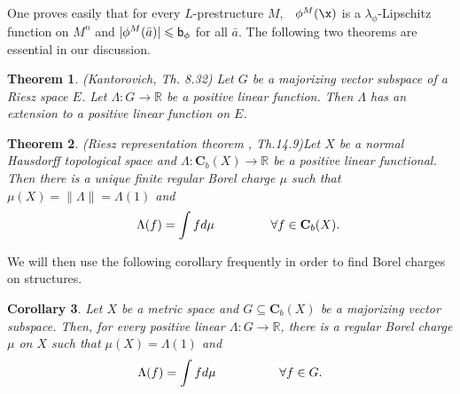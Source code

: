 \documentclass[12pt]{article}
\newtheorem{theorem}{Theorem}[section]
\newtheorem{corollary}[theorem]{Corollary}
\def\a{\bar {a}}\def\b{\bar {b}}\def\c{\bar {c}}
\def\Rn{\mathbb R}
\begin{document}
One proves easily that for every $L$-prestructure $M$,\ \ $\phi^M(\x)$ is a
$\lambda_{\phi}$-Lipschitz function on $M^n$ and $|\phi^M(\a)|\leqslant{\sf{b}}_{\phi}$ for all $\a$.
The following two theorems are essential in our discussion.

\begin{theorem} \emph{(Kantorovich, \cite{Aliprantis-Inf} Th. 8.32)} \label{ext1}
Let $G$ be a majorizing vector subspace of a Riesz space $E$.
Let $\Lambda:G\rightarrow\Rn$ be a positive linear function.
Then $\Lambda$ has an extension to a positive linear function on $E$.
\end{theorem}

\begin{theorem} (Riesz representation theorem \cite{Aliprantis-Inf}, Th.14.9)\label{Riesz representation} %
Let $X$ be a normal Hausdorff topological space and $\Lambda:{\mathbf C}_b(X)\rightarrow\Rn$ be a positive linear functional.
Then there is a unique finite regular Borel charge $\mu$ such that
$\mu(X)=\|\Lambda\|=\Lambda(1)$ and $$\ \ \ \ \Lambda(f)=\int fd\mu\hspace{16mm} \forall f\in\mathbf{C}_b(X).$$
\end{theorem}

We will then use the following corollary frequently in order to find Borel charges on structures.

\begin{corollary}\label{KR}
Let $X$ be a metric space and $G\subseteq{\mathbf C}_b(X)$ be a majorizing vector subspace.
Then, for every positive linear $\Lambda:G\rightarrow\Rn$, there is a regular Borel charge $\mu$ on $X$
such that $\mu(X)=\Lambda(1)$ and $$\Lambda(f)=\int fd\mu\hspace{18mm} \forall f\in G.$$
\end{corollary}
\end{document}
